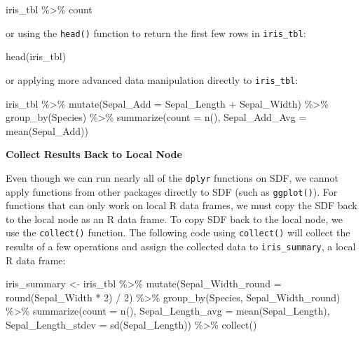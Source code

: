 \documentclass[
  12pt,
]{krantz}
\makeatletter
\newenvironment{Shaded}{\begin{snugshade}}{\end{snugshade}}
\newcommand{\AttributeTok}[1]{\textcolor[rgb]{0.61,0.61,0.61}{#1}}
\newcommand{\DecValTok}[1]{\textcolor[rgb]{0.06,0.06,0.06}{#1}}
\newcommand{\FunctionTok}[1]{\textcolor[rgb]{0,0,0}{#1}}
\newcommand{\NormalTok}[1]{#1}
\newcommand{\OtherTok}[1]{\textcolor[rgb]{0.37,0.37,0.37}{#1}}
\newcommand{\SpecialCharTok}[1]{\textcolor[rgb]{0,0,0}{#1}}
\newenvironment{kframe}{%
\medskip{}
\setlength{\fboxsep}{.8em}
 \def\at@end@of@kframe{}%
 \ifinner\ifhmode%
  \def\at@end@of@kframe{\end{minipage}}%
  \begin{minipage}{\columnwidth}%
 \fi\fi%
 \def\FrameCommand##1{\hskip\@totalleftmargin \hskip-\fboxsep
 \colorbox{shadecolor}{##1}\hskip-\fboxsep
     \hskip-\linewidth \hskip-\@totalleftmargin \hskip\columnwidth}%
 \MakeFramed {\advance\hsize-\width
   \@totalleftmargin\z@ \linewidth\hsize
   \@setminipage}}%
 {\par\unskip\endMakeFramed%
 \at@end@of@kframe}
\renewenvironment{Shaded}{\begin{kframe}}{\end{kframe}}
\makeatother
\begin{document}
\begin{Shaded}
\begin{Highlighting}[]
\NormalTok{iris\_tbl }\SpecialCharTok{\%\textgreater{}\%}\NormalTok{ count}
\end{Highlighting}
\end{Shaded}

or using the \texttt{head()} function to return the first few rows in \texttt{iris\_tbl}:

\begin{Shaded}
\begin{Highlighting}[]
\FunctionTok{head}\NormalTok{(iris\_tbl)}
\end{Highlighting}
\end{Shaded}

or applying more advanced data manipulation directly to \texttt{iris\_tbl}:

\begin{Shaded}
\begin{Highlighting}[]
\NormalTok{iris\_tbl }\SpecialCharTok{\%\textgreater{}\%}
    \FunctionTok{mutate}\NormalTok{(}\AttributeTok{Sepal\_Add =}\NormalTok{ Sepal\_Length }\SpecialCharTok{+}\NormalTok{ Sepal\_Width) }\SpecialCharTok{\%\textgreater{}\%}
    \FunctionTok{group\_by}\NormalTok{(Species) }\SpecialCharTok{\%\textgreater{}\%}
    \FunctionTok{summarize}\NormalTok{(}\AttributeTok{count =} \FunctionTok{n}\NormalTok{(), }\AttributeTok{Sepal\_Add\_Avg =} \FunctionTok{mean}\NormalTok{(Sepal\_Add))}
\end{Highlighting}
\end{Shaded}

\textbf{Collect Results Back to Local Node}

Even though we can run nearly all of the \texttt{dplyr} functions on SDF, we cannot apply functions from other packages directly to SDF (such as \texttt{ggplot()}). For functions that can only work on local R data frames, we must copy the SDF back to the local node as an R data frame. To copy SDF back to the local node, we use the \texttt{collect()} function. The following code using \texttt{collect()} will collect the results of a few operations and assign the collected data to \texttt{iris\_summary}, a local R data frame:

\begin{Shaded}
\begin{Highlighting}[]
\NormalTok{iris\_summary }\OtherTok{\textless{}{-}}\NormalTok{ iris\_tbl }\SpecialCharTok{\%\textgreater{}\%}
    \FunctionTok{mutate}\NormalTok{(}\AttributeTok{Sepal\_Width\_round =} \FunctionTok{round}\NormalTok{(Sepal\_Width }\SpecialCharTok{*} \DecValTok{2}\NormalTok{) }\SpecialCharTok{/} \DecValTok{2}\NormalTok{) }\SpecialCharTok{\%\textgreater{}\%}
    \FunctionTok{group\_by}\NormalTok{(Species, Sepal\_Width\_round) }\SpecialCharTok{\%\textgreater{}\%}
    \FunctionTok{summarize}\NormalTok{(}\AttributeTok{count =} \FunctionTok{n}\NormalTok{(), }\AttributeTok{Sepal\_Length\_avg =} \FunctionTok{mean}\NormalTok{(Sepal\_Length),}
    \AttributeTok{Sepal\_Length\_stdev =} \FunctionTok{sd}\NormalTok{(Sepal\_Length)) }\SpecialCharTok{\%\textgreater{}\%}
    \FunctionTok{collect}\NormalTok{()}
\end{Highlighting}
\end{Shaded}
\end{document}
